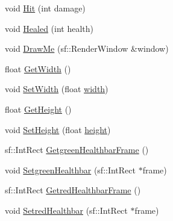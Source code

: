 \begin{DoxyCompactItemize}
\item 
void \hyperlink{classHealth_a565eec980a98122472e88c57e43b9f16}{Hit} (int damage)
\item 
void \hyperlink{classHealth_a4751425ec15871be5d6c6d1dfed802da}{Healed} (int health)
\item 
void \hyperlink{classHealth_abc51f575e1a99e051f1f6f083a5c741c}{Draw\+Me} (sf\+::\+Render\+Window \&window)
\item 
float \hyperlink{classHealth_ac2aee4fb32f092e7addabbdc99a940f0}{Get\+Width} ()
\item 
void \hyperlink{classHealth_af33d61bd7dc4a9170ccfb7d817368bce}{Set\+Width} (float \hyperlink{classHealth_a423cedff47687a9b3cdbaa4b0b2979ac}{width})
\item 
float \hyperlink{classHealth_a0cc69b9b984685baee82de1fcc68fd20}{Get\+Height} ()
\item 
void \hyperlink{classHealth_abfd1e3aa7c2375df987cb0850d0a9085}{Set\+Height} (float \hyperlink{classHealth_a28762e189b693258d4435e3082bad0b1}{height})
\item 
sf\+::\+Int\+Rect \hyperlink{classHealth_a0cb7a1759d9e7c0ac6e87957adf2e05a}{Getgreen\+Healthbar\+Frame} ()
\item 
void \hyperlink{classHealth_a5877be0a12b5188dfdff502eca579373}{Setgreen\+Healthbar} (sf\+::\+Int\+Rect $\ast$frame)
\item 
sf\+::\+Int\+Rect \hyperlink{classHealth_a14d451d9eea36482be11eb612c3945e8}{Getred\+Healthbar\+Frame} ()
\item 
void \hyperlink{classHealth_a436a8bce74a05d8dbc3eda57db64a2db}{Setred\+Healthbar} (sf\+::\+Int\+Rect $\ast$frame)
\end{DoxyCompactItemize}
